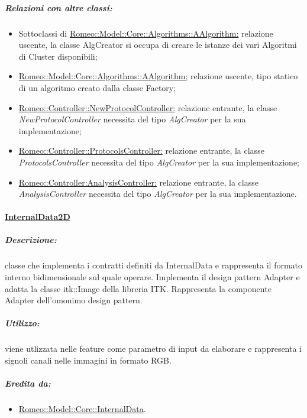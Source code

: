 			\subparagraph{Relazioni con altre classi:}
				\begin{itemize}
					\item Sottoclassi di \hyperref[AAlgorithm]{Romeo::Model::Core::Algorithms::AAlgorithm:} relazione uscente, la classe AlgCreator si occupa di creare le istanze dei vari Algoritmi di Cluster\g{} disponibili;
				
					\item \hyperref[AAlgorithm]{Romeo::Model::Core::Algorithms::AAlgorithm;} relazione uscente, tipo statico di un algoritmo creato dalla classe Factory;
					
					\item \hyperref[]{Romeo::Controller::NewProtocolController:} relazione entrante, la classe \textsl{NewProtocolController} necessita del tipo \textsl{AlgCreator} per la sua implementazione;
					
					\item \hyperref[]{Romeo::Controller::ProtocolsController:} relazione entrante, la classe \textsl{ProtocolsController} necessita del tipo \textsl{AlgCreator} per la sua implementazione;
					
					\item \hyperref[]{Romeo::Controller:AnalysisController:} relazione entrante, la classe \textsl{AnalysisController} necessita del tipo \textsl{AlgCreator} per la sua implementazione.
				\end{itemize}
			
		\paragraph{\underline{InternalData2D}}
		\label{core_internal2d}
		
			\subparagraph{Descrizione:} classe che implementa i contratti definiti da InternalData e rappresenta il formato interno bidimensionale sul quale operare. Implementa il design pattern Adapter e adatta la classe itk::Image della libreria ITK\g{}. Rappresenta la componente Adapter dell'omonimo design pattern\g{}.
			
			\subparagraph{Utilizzo:} viene utlizzata nelle feature\g{} come parametro di input da elaborare e rappresenta i signoli canali nelle immagini in formato RGB.
			
			\subparagraph{Eredita da:}
				\begin{itemize}
					\item \hyperref[internaldata]{Romeo::Model::Core::InternalData}.
				\end{itemize}
				
